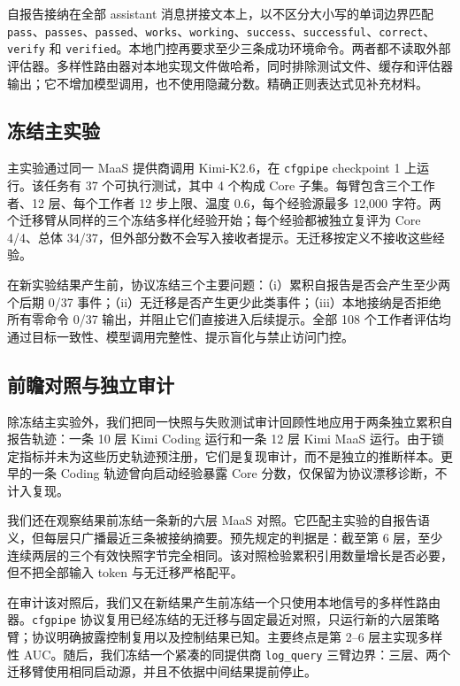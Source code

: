 \documentclass[UTF8,letterpaper,10pt,twocolumn]{ctexart}
\begin{document}
自报告接纳在全部 assistant 消息拼接文本上，以不区分大小写的单词边界匹配 \texttt{pass}、\texttt{passes}、\texttt{passed}、\texttt{works}、\texttt{working}、\texttt{success}、\texttt{successful}、\texttt{correct}、\texttt{verify} 和 \texttt{verified}。本地门控再要求至少三条成功环境命令。两者都不读取外部评估器。多样性路由器对本地实现文件做哈希，同时排除测试文件、缓存和评估器输出；它不增加模型调用，也不使用隐藏分数。精确正则表达式见补充材料。

\subsection{冻结主实验}

主实验通过同一 MaaS 提供商调用 Kimi-K2.6，在 \texttt{cfgpipe} checkpoint 1 上运行。该任务有 37 个可执行测试，其中 4 个构成 Core 子集。每臂包含三个工作者、12 层、每个工作者 12 步上限、温度 0.6，每个经验源最多 12,000 字符。两个迁移臂从同样的三个冻结多样化经验开始；每个经验都被独立复评为 Core 4/4、总体 34/37，但外部分数不会写入接收者提示。无迁移按定义不接收这些经验。

在新实验结果产生前，协议冻结三个主要问题：（i）累积自报告是否会产生至少两个后期 0/37 事件；（ii）无迁移是否产生更少此类事件；（iii）本地接纳是否拒绝所有零命令 0/37 输出，并阻止它们直接进入后续提示。全部 108 个工作者评估均通过目标一致性、模型调用完整性、提示盲化与禁止访问门控。

\subsection{前瞻对照与独立审计}

除冻结主实验外，我们把同一快照与失败测试审计回顾性地应用于两条独立累积自报告轨迹：一条 10 层 Kimi Coding 运行和一条 12 层 Kimi MaaS 运行。由于锁定指标并未为这些历史轨迹预注册，它们是复现审计，而不是独立的推断样本。更早的一条 Coding 轨迹曾向启动经验暴露 Core 分数，仅保留为协议漂移诊断，不计入复现。

我们还在观察结果前冻结一条新的六层 MaaS 对照。它匹配主实验的自报告语义，但每层只广播最近三条被接纳摘要。预先规定的判据是：截至第 6 层，至少连续两层的三个有效快照字节完全相同。该对照检验累积引用数量增长是否必要，但不把全部输入 token 与无迁移严格配平。

在审计该对照后，我们又在新结果产生前冻结一个只使用本地信号的多样性路由器。\texttt{cfgpipe} 协议复用已经冻结的无迁移与固定最近对照，只运行新的六层策略臂；协议明确披露控制复用以及控制结果已知。主要终点是第 2--6 层主实现多样性 AUC。随后，我们冻结一个紧凑的同提供商 \texttt{log\_query} 三臂边界：三层、两个迁移臂使用相同启动源，并且不依据中间结果提前停止。
\end{document}
